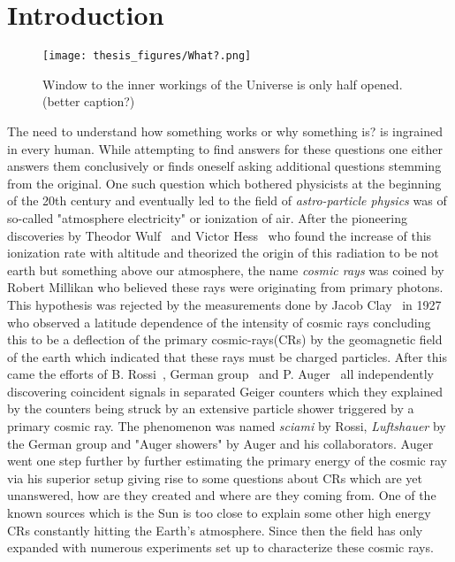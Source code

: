 
\chapter{Introduction}
\label{sec:intro}
\begin{figure}[h!]
\centering
  \texttt{[image: thesis\_figures/What?.png]}
\caption{Window to the inner workings of the Universe is only half opened. (better caption?)}
\label{fig:intro}
\end{figure}
The need to understand how something works or why something is? is ingrained in every human. While attempting to find answers for these questions one either answers them conclusively or finds oneself asking additional questions stemming from the original. One such question which bothered physicists at the beginning of the 20th century and eventually led to the field of \textit{astro-particle physics} was of so-called "atmosphere electricity" or ionization of air. After the pioneering discoveries by Theodor Wulf~\cite{article_Wulf} and Victor Hess~\cite{Hess:1912srp} who found the increase of this ionization rate with altitude and theorized the origin of this radiation to be not earth but something above our atmosphere, the name \textit{cosmic rays} was coined by Robert Millikan who believed these rays were originating from primary photons. This hypothesis was rejected by the measurements done by Jacob Clay~\cite{Clay:1927I,Clay:1928II} in 1927 who observed a latitude dependence of the intensity of cosmic rays concluding this to be a deflection of the primary cosmic-rays(CRs) by the geomagnetic field of the earth which indicated that these rays must be charged particles. After this came the efforts of B. Rossi~\cite{rossi1933eigenschaften}, German group~\cite{schmeiser1938harten} and P. Auger~\cite{RevModPhys.11.288} all independently discovering coincident signals in separated Geiger counters which they explained by the counters being struck by an extensive particle shower triggered by a primary cosmic ray. The phenomenon was named \textit{sciami} by Rossi, \textit{Luftshauer} by the German group and "Auger showers" by Auger and his collaborators. Auger went one step further by further estimating the primary energy of the cosmic ray via his superior setup giving rise to some questions about CRs which are yet unanswered, how are they created and where are they coming from. One of the known sources which is the Sun is too close to explain some other high energy CRs constantly hitting the Earth's atmosphere. Since then the field has only expanded with numerous experiments set up to characterize these cosmic rays. 

